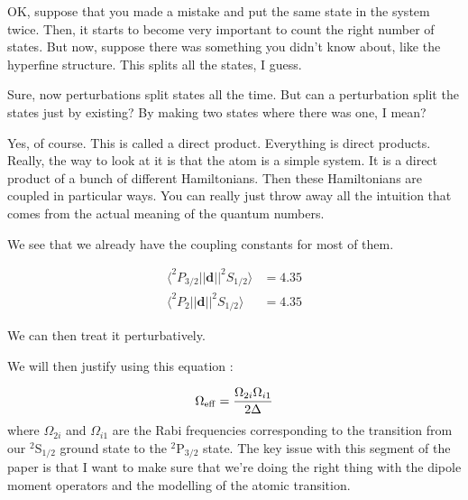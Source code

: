OK, suppose that you made a mistake and put the same state in the system twice. Then, it starts to become very important to count the right number of states. But now, suppose there was something you didn't know about, like the hyperfine structure. This splits all the states, I guess. 

Sure, now perturbations split states all the time. But can a perturbation split the states just by existing? By making two states where there was one, I mean? 

Yes, of course. This is called a direct product. Everything is direct products. Really, the way to look at it is that the atom is a simple system. It is a direct product of a bunch of different Hamiltonians. Then these Hamiltonians are coupled in particular ways. You can really just throw away all the intuition that comes from the actual meaning of the quantum numbers. 


We see that we already have the coupling constants for most of them. %

\begin{align}
\langle ^2 P_{3/2}||\mathbf{d}||^2 S_{1/2} \rangle &= 4.35 \\
\langle ^2 P_{2}||\mathbf{d}||^2 S_{1/2} \rangle &= 4.35
\end{align}

We can then treat it perturbatively. 

We will then justify using this equation \cite{footAtomicPhysics} \cite{RamanBeamSplit}: 

\begin{equation}
\Omega_{\rm eff}=\frac{\Omega_{2i} \Omega_{i1}}{2 \Delta}
\end{equation}
where $\Omega_{2i}$ and $\Omega_{i1}$ are the Rabi frequencies corresponding to the transition from our $^2$S$_{1/2}$ ground state to the  $^2$P$_{3/2}$ state. 
The key issue with this segment of the paper is that I want to make sure that we're doing the right thing with the dipole moment operators and the modelling of the atomic transition.  %

